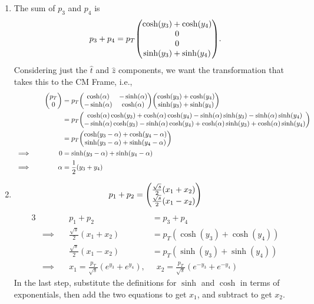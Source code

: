 \documentclass[12pt]{article}
\begin{document}
\begin{enumerate}[label=(\alph*)]
    \item The sum of $p_3$ and $p_4$ is
    \[ p_3 + p_4 = p_T\mqty(\cosh(y_3) + \cosh(y_4)\\0\\0\\\sinh(y_3)+\sinh(y_4)). \]
    Considering just the $\hat{t}$ and $\hat{z}$ components, we want the transformation that takes this to the CM Frame, i.e.,
    \begin{alignat*}{3}
        &         \quad & \mqty(p_T\\0) &= p_T\mqty(\cosh(\alpha)&-\sinh(\alpha)\\-\sinh(\alpha)&\cosh(\alpha))\mqty(\cosh(y_3) + \cosh(y_4)\\\sinh(y_3)+\sinh(y_4))  \\
        &         \quad &   &= p_T\mqty(\cosh(\alpha)\cosh(y_3) + \cosh(\alpha)\cosh(y_4) - \sinh(\alpha)\sinh(y_3) - \sinh(\alpha)\sinh(y_4) \\ -\sinh(\alpha)\cosh(y_3) - \sinh(\alpha)\cosh(y_4) + \cosh(\alpha)\sinh(y_3) + \cosh(\alpha)\sinh(y_4)) \\ 
        &         \quad &   &= p_T\mqty(\cosh(y_3 - \alpha) + \cosh(y_4 - \alpha) \\ \sinh(y_3 - \alpha) + \sinh(y_4 - \alpha)) \\
        &\implies \quad & 0 &= \sinh(y_3 - \alpha) + \sinh(y_4 - \alpha) \\
        &\implies \quad & \alpha &= \frac{1}{2}(y_3 + y_4)
    \end{alignat*}
    
    \item
    \[ p_1 + p_2 = \mqty(\frac{\sqrt{s}}{2}(x_1 + x_2) \\ \frac{\sqrt{s}}{2}(x_1 - x_2)) \]
    \begin{alignat*}{3}
        &         \quad & p_1 + p_2 &= p_3 + p_4 \\
        &\implies \quad & \frac{\sqrt{s}}{2}(x_1 + x_2) &=  p_T(\cosh(y_3) + \cosh(y_4)) \\
        &         \quad & \frac{\sqrt{s}}{2}(x_1 - x_2) &=  p_T(\sinh(y_3) + \sinh(y_4)) \\
        &\implies \quad & x_1 = \frac{p_T}{\sqrt{s}}\left(e^{y_3} + e^{y_4}\right),&\;\; x_2 = \frac{p_T}{\sqrt{s}}\left(e^{-y_3} + e^{-y_4}\right)
    \end{alignat*}
    In the last step, substitute the definitions for $\sinh$ and $\cosh$ in terms of exponentials, then add the two equations to get $x_1$, and subtract to get $x_2$.


\end{enumerate}
\end{document}
